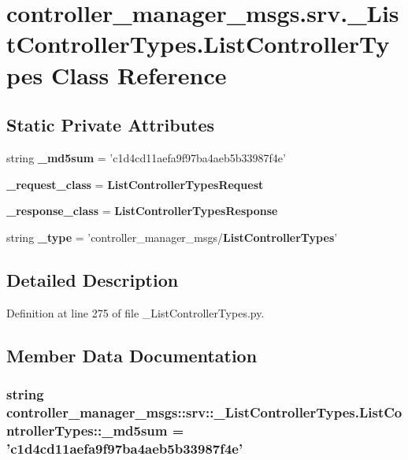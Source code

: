 \section{controller\-\_\-manager\-\_\-msgs.\-srv.\-\_\-\-List\-Controller\-Types.\-List\-Controller\-Types \-Class \-Reference}
\label{classcontroller__manager__msgs_1_1srv_1_1__ListControllerTypes_1_1ListControllerTypes}
\subsection*{\-Static \-Private \-Attributes}
\begin{DoxyCompactItemize}
\item 
string {\bf \-\_\-md5sum} = 'c1d4cd11aefa9f97ba4aeb5b33987f4e'
\item 
{\bf \-\_\-request\-\_\-class} = {\bf \-List\-Controller\-Types\-Request}
\item 
{\bf \-\_\-response\-\_\-class} = {\bf \-List\-Controller\-Types\-Response}
\item 
string {\bf \-\_\-type} = 'controller\-\_\-manager\-\_\-msgs/{\bf \-List\-Controller\-Types}'
\end{DoxyCompactItemize}


\subsection{\-Detailed \-Description}


\-Definition at line 275 of file \-\_\-\-List\-Controller\-Types.\-py.



\subsection{\-Member \-Data \-Documentation}
\subsubsection[{\-\_\-md5sum}]{\setlength{\rightskip}{0pt plus 5cm}string {\bf controller\-\_\-manager\-\_\-msgs\-::srv\-::\-\_\-\-List\-Controller\-Types.\-List\-Controller\-Types\-::\-\_\-md5sum} = 'c1d4cd11aefa9f97ba4aeb5b33987f4e'\hspace{0.3cm}{\ttfamily  [static, private]}}\label{classcontroller__manager__msgs_1_1srv_1_1__ListControllerTypes_1_1ListControllerTypes_a3c434105ad238693056312181a50b6ee}


